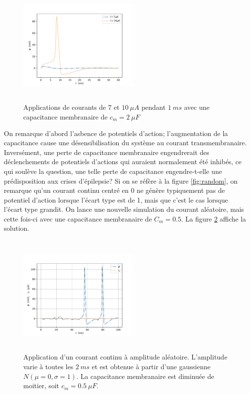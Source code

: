\documentclass{article}
\begin{document}
\begin{figure}[H]
	\includegraphics[width=6cm, height=6cm]{Cm_2.pdf}
	\centering
	\caption{Applications de courants de $7$ et $10\ \mu A$ pendant $1\ ms$ avec une capacitance membranaire de $c_m=2\ \mu F$}
	\label{fig:cm_2}
\end{figure}

On remarque d'abord l'asbence de potentiels d'action; l'augmentation de la capacitance cause une désensibilisation du système au courant transmembranaire. Inversément, une perte de capacitance membranaire engendrerait des déclenchements de potentiels d'actions qui auraient normalement été inhibés, ce qui soulève la question, une telle perte de capacitance engendre-t-elle une prédisposition aux crises d'épilepsie? Si on se réfère à la figure \ref{fig:random}, on remarque qu'un courant continu centré en 0 ne génère typiquement pas de potentiel d'action lorsque l'écart type est de 1, mais que c'est le cas lorsque l'écart type grandit. On lance une nouvelle simulation du courant aléatoire, mais cette fois-ci avec une capacitance membranaire de $C_m = 0.5$. La figure \ref{fig:random_cm} affiche la solution.

\begin{figure}[H]
	\includegraphics[width=6cm, height=6cm]{randomCm.pdf}
	\centering
	\caption{Application d'un courant continu à amplitude aléatoire. L'amplitude varie à toutes les $2\ ms$ et est obtenue à partir d'une gaussienne $N(\mu = 0, \sigma = 1)$. La capacitance membranaire est diminuée de moitier, soit $c_m=0.5\ \mu F$.}
	\label{fig:random_cm}
\end{figure}
\end{document}
